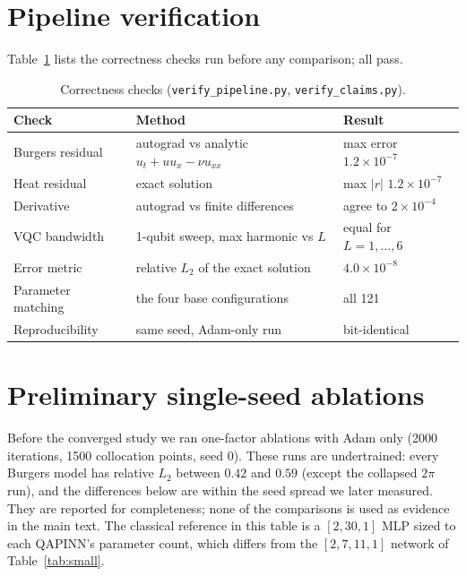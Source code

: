 \documentclass[11pt]{article}
\newcommand{\relL}{relative $L_2$}
\begin{document}
\section{Pipeline verification}\label{app:verify}
Table~\ref{tab:verify} lists the correctness checks run before any comparison; all pass.
\begin{table}[H]
  \centering\small
  \begin{tabular}{lll}
    \toprule
    Check & Method & Result \\
    \midrule
    Burgers residual & autograd vs analytic $u_t+uu_x-\nu u_{xx}$ & max error $1.2\times10^{-7}$ \\
    Heat residual & exact solution & max $|r|$ $1.2\times10^{-7}$ \\
    Derivative & autograd vs finite differences & agree to $2\times10^{-4}$ \\
    VQC bandwidth & 1-qubit sweep, max harmonic vs $L$ & equal for $L=1,\dots,6$ \\
    Error metric & \relL{} of the exact solution & $4.0\times10^{-8}$ \\
    Parameter matching & the four base configurations & all 121 \\
    Reproducibility & same seed, Adam-only run & bit-identical \\
    \bottomrule
  \end{tabular}
  \caption{Correctness checks (\texttt{verify\_pipeline.py}, \texttt{verify\_claims.py}).}
  \label{tab:verify}
\end{table}

\section{Preliminary single-seed ablations}\label{app:prelim}
Before the converged study we ran one-factor ablations with Adam only (2000 iterations,
1500 collocation points, seed 0). These runs are undertrained: every Burgers model has
\relL{} between $0.42$ and $0.59$ (except the collapsed $2\pi$ run), and the
differences below are within the seed spread we later measured. They are reported for
completeness; none of the comparisons is used as evidence in the main text. The classical
reference in this table is a $[2,30,1]$ MLP sized to each QAPINN's parameter count,
which differs from the $[2,7,11,1]$ network of Table~\ref{tab:small}.
\end{document}
